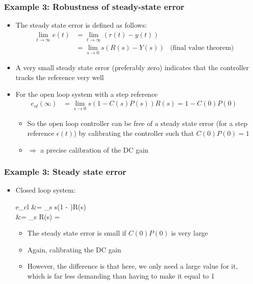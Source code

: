 \begin{frame}
	\frametitle{Example 3: Robustness of steady-state error}
	\begin{itemize}
		\item The steady state error is defined as follows:
		\begin{align*}
			\lim\limits_{t \rightarrow \infty} e(t)
			&= \lim\limits_{t \rightarrow \infty} (r(t) - y(t)) \\
			&= \lim\limits_{s \rightarrow 0} s(R(s) - Y(s)) &\text{(final value theorem)}
		\end{align*}
		
		\item A very small steady state error (preferably zero) indicates that the controller tracks the reference very well
		
		\item For the open loop system with a step reference
		\begin{align*}
			e_{ol}(\infty) &= \lim\limits_{s \rightarrow 0}
			s(1 - C(s)P(s))R(s) = 1 - C(0)P(0)
		\end{align*}
		\begin{itemize}
			\item So the open loop controller can be free of a steady state error (for a step reference $\epsilon(t)$) by calibrating the controller such that $C(0)P(0)=1$
			\item $\Rightarrow$ a precise calibration of the DC gain
		\end{itemize}
	\end{itemize}
	
\end{frame}


\begin{frame}
	\frametitle{Example 3: Steady state error}
	\begin{itemize}
		\item Closed loop system:
		\begin{flalign*}
			e_{cl} &= \lim\limits_{s } s\left(1 - \right)R(s) \\
			&= \lim\limits_{s } R(s) = 
		\end{flalign*}
		\begin{itemize}
			\item The steady state error is small if $C(0)P(0)$ is very large
			\item Again, calibrating the DC gain
			\item However, the difference is that here, we only need a large value for it, which is far less demanding than having to make it equal to 1
		\end{itemize}
	\end{itemize}
\end{frame}

